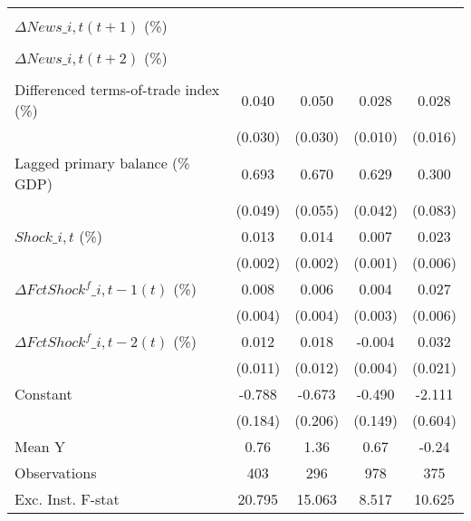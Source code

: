{\begin{tabular}{l*{4}{c}}
                    &                     &                     &                     &                     \\
\addlinespace
$ \Delta News\_{i,t}(t+1)$ (\%)&                     &                     &                     &                     \\
                    &                     &                     &                     &                     \\
\addlinespace
$ \Delta News\_{i,t}(t+2)$ (\%)&                     &                     &                     &                     \\
                    &                     &                     &                     &                     \\
\addlinespace
Differenced terms-of-trade index (\%)&       0.040         &       0.050         &       0.028\sym{***}&       0.028\sym{*}  \\
                    &     (0.030)         &     (0.030)         &     (0.010)         &     (0.016)         \\
\addlinespace
Lagged primary balance (\% GDP)&       0.693\sym{***}&       0.670\sym{***}&       0.629\sym{***}&       0.300\sym{***}\\
                    &     (0.049)         &     (0.055)         &     (0.042)         &     (0.083)         \\
\addlinespace
$ Shock\_{i,t}$ (\%) &       0.013\sym{***}&       0.014\sym{***}&       0.007\sym{***}&       0.023\sym{***}\\
                    &     (0.002)         &     (0.002)         &     (0.001)         &     (0.006)         \\
\addlinespace
$ \Delta FctShock^f\_{i,t-1}(t)$ (\%)&       0.008\sym{*}  &       0.006         &       0.004         &       0.027\sym{***}\\
                    &     (0.004)         &     (0.004)         &     (0.003)         &     (0.006)         \\
\addlinespace
$ \Delta FctShock^f\_{i,t-2}(t)$ (\%)&       0.012         &       0.018         &      -0.004         &       0.032         \\
                    &     (0.011)         &     (0.012)         &     (0.004)         &     (0.021)         \\
\addlinespace
Constant            &      -0.788\sym{***}&      -0.673\sym{***}&      -0.490\sym{***}&      -2.111\sym{***}\\
                    &     (0.184)         &     (0.206)         &     (0.149)         &     (0.604)         \\
\midrule
Mean Y              &        0.76         &        1.36         &        0.67         &       -0.24         \\
Observations        &         403         &         296         &         978         &         375         \\
Exc. Inst. F-stat   &      20.795         &      15.063         &       8.517         &      10.625         \\
\bottomrule
\end{tabular}
}
